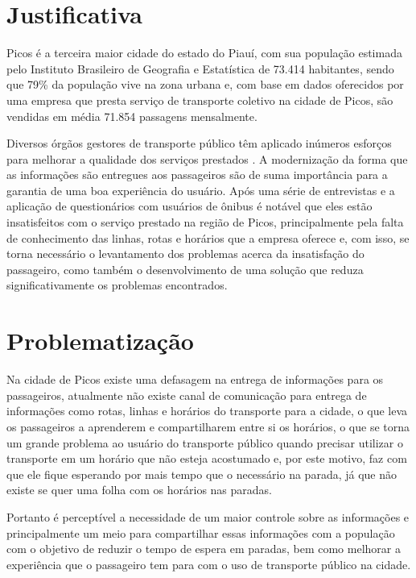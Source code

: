 \section{Justificativa}

Picos é a terceira maior cidade do estado do Piauí, com sua população estimada pelo Instituto Brasileiro de Geografia e Estatística \cite{ibge} de 73.414 habitantes, sendo que 79\% da população vive na zona urbana e, com base em dados oferecidos por uma empresa que presta serviço de transporte coletivo na cidade de Picos, são vendidas em média 71.854 passagens mensalmente.

Diversos órgãos gestores de transporte público têm aplicado inúmeros esforços para melhorar a qualidade dos serviços prestados \cite{associacao-nacional}. A modernização da forma que as informações são entregues aos passageiros são de suma importância para a garantia de uma boa experiência do usuário. Após uma série de entrevistas e a aplicação de questionários com usuários de ônibus é notável que eles estão insatisfeitos com o serviço prestado na região de Picos, principalmente pela falta de conhecimento das linhas, rotas e horários que a empresa oferece e, com isso, se torna necessário o levantamento dos problemas acerca da insatisfação do passageiro, como também o desenvolvimento de uma solução que reduza significativamente os problemas encontrados.

\section{Problematização}

Na cidade de Picos existe uma defasagem na entrega de informações para os passageiros, atualmente não existe canal de comunicação para entrega de informações como rotas, linhas e horários do transporte para a cidade, o que leva os passageiros a aprenderem e compartilharem entre si os horários, o que se torna um grande problema ao usuário do transporte público quando precisar utilizar o transporte em um horário que não esteja acostumado e, por este motivo, faz com que ele fique esperando por mais tempo que o necessário na parada, já que não existe se quer uma folha com os horários nas paradas.

Portanto é perceptível a necessidade de um maior controle sobre as informações e principalmente um meio para compartilhar essas informações com a população com o objetivo de reduzir o tempo de espera em paradas, bem como melhorar a experiência que o passageiro tem para com o uso de transporte público na cidade.

